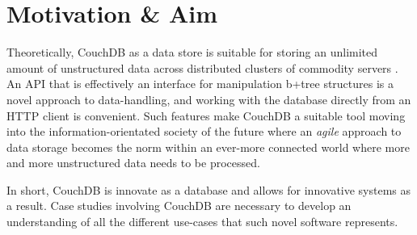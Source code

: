 \section{Motivation \& Aim}
Theoretically, CouchDB as a data store is suitable for storing an unlimited amount of unstructured data across distributed clusters of commodity servers \cite{couchdb2.0}. An API that is effectively an interface for manipulation b+tree structures is a novel approach to data-handling, and working with the database directly from an HTTP client is convenient. Such features make CouchDB a suitable tool moving into the information-orientated society of the future where an \textit{agile} approach to data storage becomes the norm within an ever-more connected world where more and more unstructured data needs to be processed.

In short, CouchDB is innovate as a database and allows for innovative systems as a result. Case studies involving CouchDB are necessary to develop an understanding of all the different use-cases that such novel software represents.